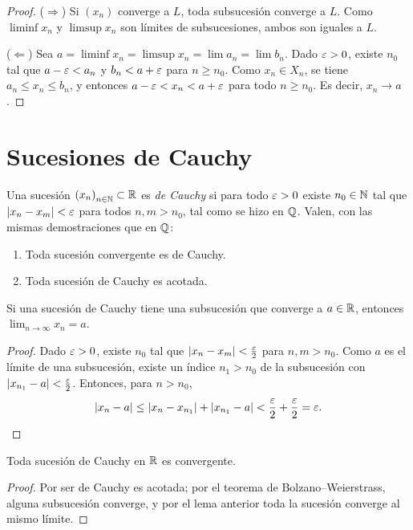 \begin{proof}
  (\(\Rightarrow\)) Si \({(x_n)}\) converge a \(L\), toda subsucesión converge a \(L\). Como \(\liminf x_n\) y \(\limsup x_n\) son límites de subsucesiones, ambos son iguales a \(L\).

  (\(\Leftarrow\)) Sea \(a = \liminf x_n = \limsup x_n = \lim a_n = \lim b_n\). Dado \(\varepsilon > 0\), existe \(n_0\) tal que \(a - \varepsilon < a_n\) y \(b_n < a + \varepsilon\) para \(n \geq n_0\). Como \(x_n \in X_n\), se tiene \(a_n \leq x_n \leq b_n\), y entonces \(a - \varepsilon < x_n < a + \varepsilon\) para todo \(n \geq n_0\). Es decir, \(x_n \to a\).
\end{proof}

\section{Sucesiones de Cauchy}

Una sucesión \({(x_n)}_{n \in \mathbb{N}} \subset \mathbb{R}\) es \emph{de Cauchy} si para todo \(\varepsilon > 0\) existe \(n_0 \in \mathbb{N}\) tal que \(|x_n - x_m| < \varepsilon\) para todos \(n, m > n_0\), tal como se hizo en \(\mathbb{Q}\). Valen, con las mismas demostraciones que en \(\mathbb{Q}\):
\begin{enumerate}[label=(\arabic*)]
  \item Toda sucesión convergente es de Cauchy.
  \item Toda sucesión de Cauchy es acotada.
\end{enumerate}

\begin{lemma}
  Si una sucesión de Cauchy tiene una subsucesión que converge a \(a \in \mathbb{R}\), entonces \(\lim_{n \to \infty} x_n = a\).
\end{lemma}

\begin{proof}
  Dado \(\varepsilon > 0\), existe \(n_0\) tal que \(|x_n - x_m| < \frac{\varepsilon}{2}\) para \(n, m > n_0\). Como \(a\) es el límite de una subsucesión, existe un índice \(n_1 > n_0\) de la subsucesión con \(|x_{n_1} - a| < \frac{\varepsilon}{2}\). Entonces, para \(n > n_0\),
  \[
    |x_n - a| \leq |x_n - x_{n_1}| + |x_{n_1} - a| < \frac{\varepsilon}{2} + \frac{\varepsilon}{2} = \varepsilon. \qedhere
  \]
\end{proof}

\begin{theorem}
  Toda sucesión de Cauchy en \(\mathbb{R}\) es convergente.
\end{theorem}

\begin{proof}
  Por ser de Cauchy es acotada; por el teorema de Bolzano--Weierstrass, alguna subsucesión converge, y por el lema anterior toda la sucesión converge al mismo límite.
\end{proof}

